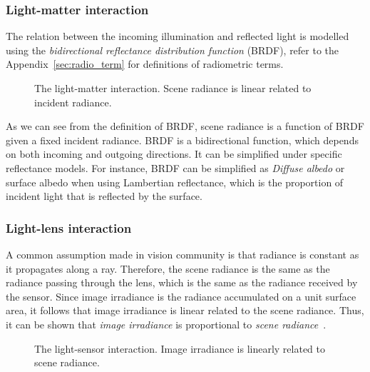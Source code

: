 \subsubsection{Light-matter interaction}
The relation between the incoming illumination and reflected light is modelled using the \textit{bidirectional reflectance distribution function} (BRDF), refer to the Appendix~\ref{sec:radio_term} for definitions of radiometric terms.
\begin{figure}[!htbp]
\centering
{}
\caption{The light-matter interaction. Scene radiance is linear related to incident radiance.}
\label{fig:light_matter_interact}
\end{figure}

As we can see from the definition of BRDF, scene radiance is a function of BRDF given a fixed incident radiance. BRDF is a bidirectional function, which depends on both incoming and outgoing directions. It can be simplified under specific reflectance models. For instance, BRDF can be simplified as \textit{Diffuse albedo} or surface albedo when using Lambertian reflectance, which is the proportion of incident light that is reflected by the surface.

\subsubsection{Light-lens interaction}
A common assumption made in vision community is that radiance is constant as it propagates along a ray. Therefore, the scene radiance is the same as the radiance passing through the lens, which is the same as the radiance received by the sensor. Since image irradiance is the radiance accumulated on a unit surface area, it follows that image irradiance is linear related to the scene radiance. Thus, it can be shown that \textit{image irradiance} is proportional to \textit{scene radiance}~\cite{forsyth2011computer}.
\begin{figure}[!ht]
\centering
{}
\caption{The light-sensor interaction. Image irradiance is linearly related to scene radiance.}
\label{fig:light_lens_interact}
\end{figure}

